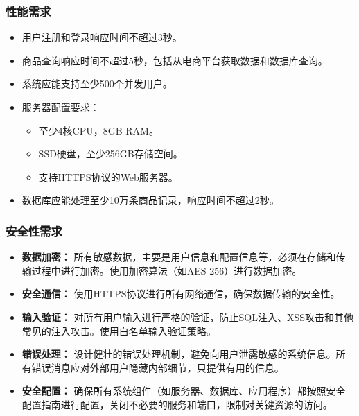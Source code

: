 \documentclass[12pt]{article}
\begin{document}
\subsubsection{性能需求}
\begin{itemize}
    \item 用户注册和登录响应时间不超过3秒。
    \item 商品查询响应时间不超过5秒，包括从电商平台获取数据和数据库查询。
    \item 系统应能支持至少500个并发用户。
    \item 服务器配置要求：
        \begin{itemize}
            \item 至少4核CPU，8GB RAM。
            \item SSD硬盘，至少256GB存储空间。
            \item 支持HTTPS协议的Web服务器。
        \end{itemize}
    \item 数据库应能处理至少10万条商品记录，响应时间不超过2秒。
\end{itemize}

\subsubsection{安全性需求}
\begin{itemize}
    \item \textbf{数据加密：} 所有敏感数据，主要是用户信息和配置信息等，必须在存储和传输过程中进行加密。使用加密算法（如AES-256）进行数据加密。
    \item \textbf{安全通信：} 使用HTTPS协议进行所有网络通信，确保数据传输的安全性。
    \item \textbf{输入验证：} 对所有用户输入进行严格的验证，防止SQL注入、XSS攻击和其他常见的注入攻击。使用白名单输入验证策略。
    \item \textbf{错误处理：} 设计健壮的错误处理机制，避免向用户泄露敏感的系统信息。所有错误消息应对外部用户隐藏内部细节，只提供有用的信息。
    \item \textbf{安全配置：} 确保所有系统组件（如服务器、数据库、应用程序）都按照安全配置指南进行配置，关闭不必要的服务和端口，限制对关键资源的访问。
\end{itemize}
\end{document}
